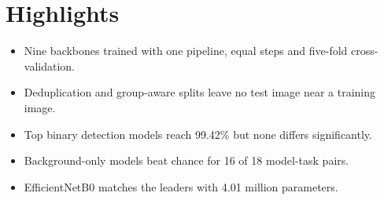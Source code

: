 \documentclass[12pt]{article}
\begin{document}
\section*{Highlights}

\begin{itemize}
\item Nine backbones trained with one pipeline, equal steps and five-fold cross-validation.
\item Deduplication and group-aware splits leave no test image near a training image.
\item Top binary detection models reach 99.42\% but none differs significantly.
\item Background-only models beat chance for 16 of 18 model-task pairs.
\item EfficientNetB0 matches the leaders with 4.01 million parameters.
\end{itemize}
\end{document}
